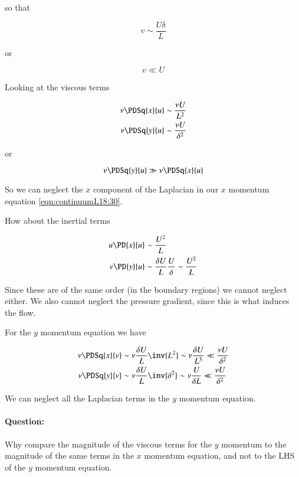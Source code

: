so that 

\begin{equation}\label{eqn:continuumL18:130}
v \sim \frac{U \delta}{L}
\end{equation}

or 

\begin{equation}\label{eqn:continuumL18:150}
v \ll U
\end{equation}

Looking at the viscous terms

\begin{align}\label{eqn:continuumL18:170}
\nu \PDSq{x}{u} &\sim \frac{\nu U}{L^2} \\
\nu \PDSq{y}{u} &\sim \frac{\nu U}{\delta^2}
\end{align}

or

\begin{equation}\label{eqn:continuumL18:190}
\nu \PDSq{y}{u} \gg \nu \PDSq{x}{u}
\end{equation}

So we can neglect the $x$ component of the Laplacian in our $x$ momentum equation \ref{eqn:continuumL18:30}.

How about the inertial terms

\begin{align}\label{eqn:continuumL18:210}
u \PD{x}{u} &\sim \frac{U^2}{L} \\
v \PD{y}{u} &\sim \frac{\delta U}{L} \frac{U}{\delta} \sim \frac{U^2}{L}
\end{align}

Since these are of the same order (in the boundary regions) we cannot neglect either.  We also cannot neglect the pressure gradient, since this is what induces the flow.

For the $y$ momentum equation we have

\begin{align}\label{eqn:continuumL18:230}
\nu \PDSq{x}{v} &\sim \nu \frac{\delta U}{L} \inv{L^2} \sim \nu \frac{\delta U}{L^3} \ll \frac{\nu U}{\delta^2} \\
\nu \PDSq{y}{v} &\sim \nu \frac{\delta U}{L} \inv{\delta^2} \sim \nu \frac{U}{\delta L} \ll \frac{\nu U}{\delta^2}
\end{align}

We can neglect all the Laplacian terms in the $y$ momentum equation.

\paragraph{Question:} Why compare the magnitude of the viscous terms for the $y$ momentum to the magnitude of the same terms in the $x$ momentum equation, and not to the LHS of the $y$ momentum equation.

